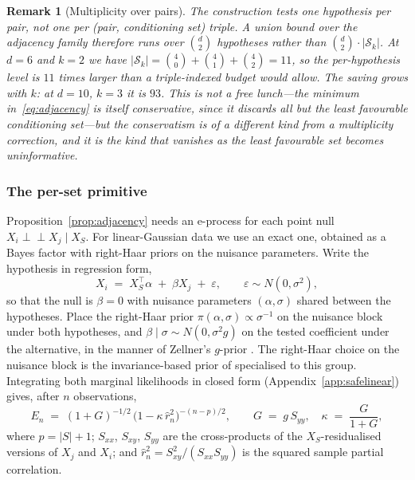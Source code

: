 \documentclass[pdflatex,sn-apa]{sn-jnl}
\theoremstyle{thmstyleone}%
\theoremstyle{thmstyletwo}%
\newtheorem{remark}{Remark}%
\theoremstyle{thmstylethree}%
\newcommand{\indep}{\perp\!\!\!\perp}
\newcommand{\Scal}{\mathcal{S}}
\begin{document}
\begin{remark}[Multiplicity over pairs]\label{rem:multiplicity-pairs}
The construction tests one hypothesis per pair, not one per (pair,
conditioning set) triple. A union bound over the adjacency family therefore
runs over $\binom{d}{2}$ hypotheses rather than
$\binom{d}{2} \cdot |\Scal_k|$. At $d = 6$ and $k = 2$ we have
$|\Scal_k| = \binom{4}{0} + \binom{4}{1} + \binom{4}{2} = 11$, so the
per-hypothesis level is $11$ times larger than a triple-indexed budget would
allow. The saving grows with $k$: at $d = 10$, $k = 3$ it is $93$. This is not
a free lunch---the minimum in~\eqref{eq:adjacency} is itself conservative,
since it discards all but the least favourable conditioning set---but the
conservatism is of a different kind from a multiplicity correction, and it is
the kind that vanishes as the least favourable set becomes uninformative.
\end{remark}

\subsubsection{The per-set primitive}\label{sec:primitive}

Proposition~\ref{prop:adjacency} needs an e-process for each point null
$X_i \indep X_j \mid X_S$. For linear-Gaussian data we use an exact one,
obtained as a Bayes factor with right-Haar priors on the nuisance parameters.
Write the hypothesis in regression form,
\begin{equation}\label{eq:regform}
X_i \;=\; X_S^\top \alpha \;+\; \beta X_j \;+\; \varepsilon,
\qquad \varepsilon \sim N(0, \sigma^2),
\end{equation}
so that the null is $\beta = 0$ with nuisance parameters $(\alpha, \sigma)$
shared between the hypotheses. Place the right-Haar prior
$\pi(\alpha, \sigma) \propto \sigma^{-1}$ on the nuisance block under both
hypotheses, and $\beta \mid \sigma \sim N(0, \sigma^2 g)$ on the tested
coefficient under the alternative, in the manner of Zellner's $g$-prior
\citep{zellner1986assessing}. The right-Haar choice on the nuisance block is
the invariance-based prior of \citet{jeffreys1946invariant} specialised to
this group. Integrating both marginal likelihoods in
closed form (Appendix~\ref{app:safelinear}) gives, after $n$ observations,
\begin{equation}\label{eq:safelinear}
E_n \;=\; (1+G)^{-1/2}\,\bigl(1 - \kappa\,\hat r_n^2\bigr)^{-(n-p)/2},
\qquad
G \;=\; g\,S_{yy}, \quad \kappa \;=\; \frac{G}{1+G},
\end{equation}
where $p = |S| + 1$; $S_{xx}$, $S_{xy}$, $S_{yy}$ are the cross-products of
the $X_S$-residualised versions of $X_j$ and $X_i$; and
$\hat r_n^2 = S_{xy}^2 / (S_{xx} S_{yy})$ is the squared sample partial
correlation.
\end{document}

